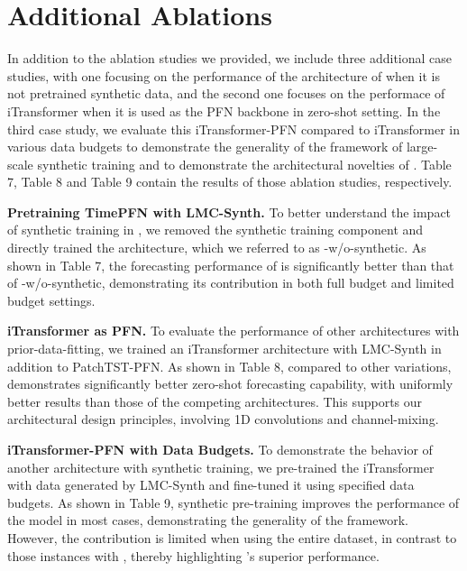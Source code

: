 \section{Additional Ablations}






In addition to the ablation studies we provided, we include three additional case studies, with one focusing on the performance of the architecture of \name when it is not pretrained synthetic data, and the second one focuses on the performace of iTransformer \cite{liu2023itransformer} when it is used as the PFN backbone in zero-shot setting. In the third case study, we evaluate this iTransformer-PFN compared to iTransformer in various data budgets to demonstrate the generality of the framework of large-scale synthetic training and to demonstrate the architectural novelties of \name. Table 7, Table 8  and Table 9 contain the results of those ablation studies, respectively. 

\textbf{Pretraining TimePFN with LMC-Synth.} To better understand the impact of synthetic training in \name, we removed the synthetic training component and directly trained the architecture, which we referred to as \name-w/o-synthetic. As shown in Table 7, the forecasting performance of \name is significantly better than that of \name-w/o-synthetic, demonstrating its contribution in both full budget and limited budget settings.

\textbf{iTransformer as PFN.} To evaluate the performance of other architectures with prior-data-fitting, we trained an iTransformer architecture with LMC-Synth in addition to PatchTST-PFN. As shown in Table 8, compared to other variations, \name demonstrates significantly better zero-shot forecasting capability, with uniformly better results than those of the competing architectures. This supports our architectural design principles, involving 1D convolutions and channel-mixing. 


\textbf{iTransformer-PFN with Data Budgets.} To demonstrate the behavior of another architecture with synthetic training, we pre-trained the iTransformer \cite{liu2023itransformer} with data generated by LMC-Synth and fine-tuned it using specified data budgets. As shown in Table 9, synthetic pre-training improves the performance of the model in most cases, demonstrating the generality of the framework. However, the contribution is limited when using the entire dataset, in contrast to those instances with \name, thereby highlighting \name's superior performance.